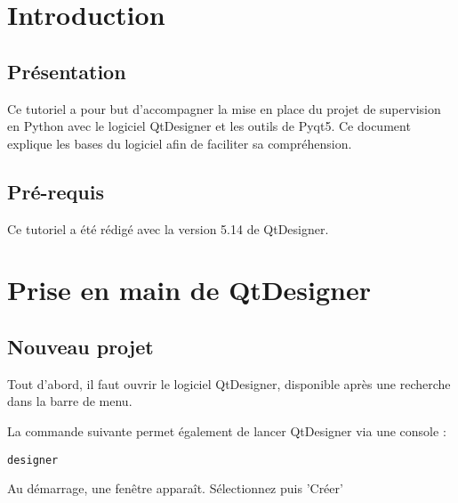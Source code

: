 
\chapter{Introduction}

\section{Présentation}

Ce tutoriel a pour but d'accompagner la mise en place du projet de supervision en Python avec le logiciel QtDesigner et les outils de Pyqt5. Ce document explique les bases du logiciel afin de faciliter sa compréhension.

\section{Pré-requis}

Ce tutoriel a été rédigé avec la version 5.14 de QtDesigner. \newline




\chapter{Prise en main de QtDesigner}

\section{Nouveau projet}

Tout d'abord, il faut ouvrir le logiciel QtDesigner, disponible après une recherche dans la barre de menu.


La commande suivante permet également de lancer QtDesigner via une console : 
\begin{lstlisting}
designer
\end{lstlisting}
Au démarrage, une fenêtre apparaît. Sélectionnez  puis 'Créer'

